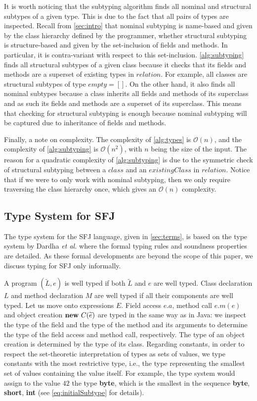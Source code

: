 \documentclass[runningheads]{llncs}
\begin{document}
It is worth noticing that the subtyping algorithm finds all nominal and structural subtypes of a given type. This is due to the fact that all pairs of types are inspected.
Recall from \autoref{sec:intro} that nominal subtyping is name-based and given by the class hierarchy defined by the programmer, whether structural subtyping is structure-based and given by the set-inclusion of fields and methods. In particular, it is contra-variant with respect to this set-inclusion.
\autoref{alg:subtyping} finds all structural subtypes of a given class because it checks that its fields and methods are a superset of existing types in $relation$. For example, all classes are structural subtypes of type $empty = []$.
On the other hand, it also finds all nominal subtypes because a class inherits all fields and methods of its superclass and as such its fields and methods are a superset of its superclass.
This means that checking for structural subtyping is enough because nominal subtyping will be captured due to inheritance of fields and methods.

Finally, a note on complexity.
The complexity of \autoref{alg:types} is $\mathcal{O}(n)$, and the complexity of \autoref{alg:subtyping} is $\mathcal{O}(n^{2})$, with $n$ being the size of the input.
The reason for a quadratic complexity of \autoref{alg:subtyping} is due to the symmetric check of structural subtyping between a $class$ and an $existingClass$ in $relation$.
Notice that if we were to only work with nominal subtyping, then we only require traversing the class hierarchy once,  which gives an $\mathcal{O}(n)$ complexity.

\subsection{Type System for SFJ}
\label{sec:typing}

The type system for the SFJ language, given in \autoref{sec:terms}, is based on the type system by Dardha \emph{et al.} \cite{Dardha2013,Dardha2017} where the formal typing rules and soundness properties are detailed. As these formal developments are beyond the scope of this paper, we discuss typing for SFJ only informally.

A program $(\tilde L,e)$ is well typed if both $\tilde{L}$ and $e$ are well typed.
Class declaration $L$ and method declaration $M$ are well typed if all their components are well typed.
Let us move onto expressions $E$.
Field access $e.a$, method call $e.m(e)$ and object creation $\mathbf{new}\  C(\widetilde{e})$ are typed in the same way as in Java: we inspect the type of the field and the type of the method and its arguments to determine the type of the field access and method call, respectively. The type of an object creation is determined by the type of its class.
Regarding constants, in order to respect the set-theoretic interpretation of types as sets of values, we type constants with the most restrictive type, i.e., the type representing the smallest set of values containing the value itself.
For example, the type system would assign to the value $42$ the type \textbf{byte}, which is the smallest in the sequence \textbf{byte}, \textbf{short}, \textbf{int} (see \autoref{eq:initialSubtype} for details).
\end{document}
